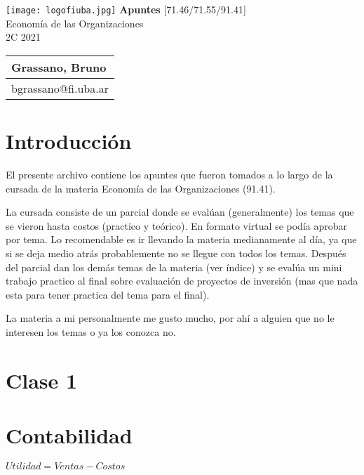 \documentclass[titlepage,a4paper]{article}
\begin{document}
\begin{titlepage} %
	\hfill\texttt{[image: logofiuba.jpg]}
    \centering
    \vfill
    \Huge \textbf{Apuntes}
    \vskip2cm
    \Large [71.46/71.55/91.41] \\ Economía de las Organizaciones\\
    2C 2021 
    \vfill
    \begin{tabular}{ | l | } %
      \hline
      Grassano, Bruno \\ \hline
      bgrassano@fi.uba.ar \\ \hline
  	\end{tabular}
    \vfill
    \vfill
\end{titlepage}

\tableofcontents %

\newpage

\section*{Introducción}\label{sec:intro}
El presente archivo contiene los apuntes que fueron tomados a lo largo de la cursada de la materia Economía de las Organizaciones (91.41). 

La cursada consiste de un parcial donde se evalúan (generalmente) los temas que se vieron hasta costos (practico y teórico). En formato virtual se podía aprobar por tema. Lo recomendable es ir llevando la materia medianamente al día, ya que si se deja medio atrás probablemente no se llegue con todos los temas. Después del parcial dan los demás temas de la materia (ver índice) y se evalúa un mini trabajo practico al final sobre evaluación de proyectos de inversión (mas que nada esta para tener practica del tema para el final).

La materia a mi personalmente me gusto mucho, por ahí a alguien que no le interesen los temas o ya los conozca no.

\newpage
\section*{Clase 1}
\section{Contabilidad}

\begin{center}
$Utilidad = Ventas - Costos$
\end{center}
\end{document}
